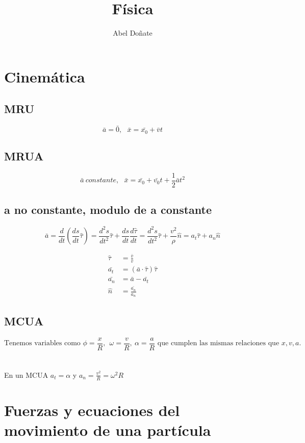 \documentclass[12pt]{article}
\title{Física}
\author{Abel Doñate}
\date{}
\begin{document}
\maketitle
\tableofcontents
\newpage

\section{Cinemática}
\subsection{MRU}
\[\bar{a}=\bar{0},  \ \ \ \bar{x}=\bar{x_0}+\bar{v}t\]

\subsection{MRUA}
\[\bar{a} \ constante,  \ \ \ \bar{x}=\bar{x_0}+\bar{v_0}t+\frac{1}{2}\bar{a}t^2\]

\subsection{a no constante, modulo de a constante}
\[\bar{a}=\frac{d}{dt}(\frac{ds}{dt}\hat{\tau})=\frac{d^2s}{dt^2}\hat{\tau}+\frac{ds}{dt}\frac{d\hat{\tau}}{dt}=\frac{d^2s}{dt^2}\hat{\tau}+\frac{v^2}{\rho}\hat{n}=a_t\hat{\tau}+a_n\hat{n}\]



\begin{align*}
\hat{\tau} &=  \frac{\bar{v}}{v} \\
\bar{a_t} &=  (\bar{a}\cdot \hat{\tau})\hat{\tau} \\
\bar{a_n} &= \bar{a} - \bar{a_t} \\
\hat{n}  &=\frac{\bar{a_n}}{a_n}
\end{align*}

\subsection{MCUA}
\[ \text{Tenemos variables como } \phi=\frac{x}{R}, \ \ \omega=\frac{v}{R}, \  \alpha=\frac{a}{R} \text{ que cumplen las mismas relaciones que } x,v,a.\]
\\
\\
En un MCUA $a_t = \alpha$ y $a_n=\frac{v^2}{R}=\omega^2R$

\section{Fuerzas y ecuaciones del movimiento de una partícula}
\end{document}
